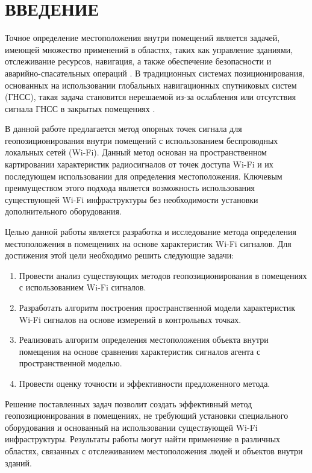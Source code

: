 \chapter*{ВВЕДЕНИЕ}

Точное определение местоположения внутри помещений является задачей, имеющей множество применений в областях, таких как управление зданиями, отслеживание ресурсов, навигация, а также обеспечение безопасности и аварийно-спасательных операций \cite{basebook}. В традиционных системах позиционирования, основанных на использовании глобальных навигационных спутниковых систем (ГНСС), такая задача становится нерешаемой из-за ослабления или отсутствия сигнала ГНСС в закрытых помещениях \cite{GPSdrawbacks}.

В данной работе предлагается метод опорных точек сигнала для геопозиционирования внутри помещений с использованием беспроводных локальных сетей (Wi-Fi). Данный метод основан на пространственном картировании характеристик радиосигналов от точек доступа Wi-Fi и их последующем использовании для определения местоположения. Ключевым преимуществом этого подхода является возможность использования существующей Wi-Fi инфраструктуры без необходимости установки дополнительного оборудования.

Целью данной работы является разработка и исследование метода определения местоположения в помещениях на основе характеристик Wi-Fi сигналов. Для достижения этой цели необходимо решить следующие задачи:

\begin{enumerate}
    \item Провести анализ существующих методов геопозиционирования в помещениях с использованием Wi-Fi сигналов.
    \item Разработать алгоритм построения пространственной модели характеристик Wi-Fi сигналов на основе измерений в контрольных точках.
    \item Реализовать алгоритм определения местоположения объекта внутри помещения на основе сравнения характеристик сигналов агента с пространственной моделью.
    \item Провести оценку точности и эффективности предложенного метода.
\end{enumerate}

Решение поставленных задач позволит создать эффективный метод геопозиционирования в помещениях, не требующий установки специального оборудования и основанный на использовании существующей Wi-Fi инфраструктуры. Результаты работы могут найти применение в различных областях, связанных с отслеживанием местоположения людей и объектов внутри зданий.
